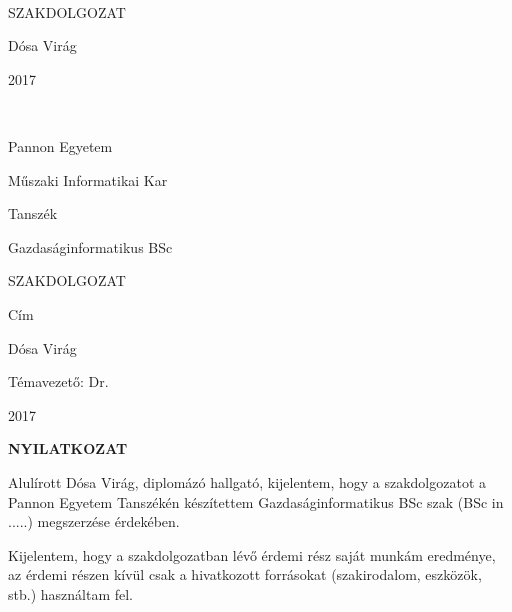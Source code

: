 \begin{titlepage}
	\setlength{\hoffset}{0mm}
	\pagestyle{empty}
	\begin{center} 
		~\\
		\vspace{125pt}	
		\Large SZAKDOLGOZAT
		\vspace{200pt}
		
		\Large Dósa Virág
		\vspace{60pt}
		
		\Large 2017
	\end{center}
	
	\newpage
	
	\pagestyle{empty}
	~\\
	
	\newpage
	\pagestyle{empty}
	\begin{center}
		\Large
		Pannon Egyetem
		
		\vspace{10mm}
		Műszaki Informatikai Kar
		
		\vspace{10mm}
		Tanszék
		
		\vspace{10mm}
		Gazdaságinformatikus BSc
		
		\vspace{40mm}
		\huge
		SZAKDOLGOZAT
		
		\vspace{10mm}
		\LARGE
		Cím
		
		\vspace{10mm}
		\Large
		Dósa Virág
		
		\vspace{15mm}
		Témavezető: Dr.
		
		\vspace{20mm}
		2017
		\normalsize
	\end{center}
\end{titlepage}

\setlength{\hoffset}{4mm}
\newpage
	
	
\newpage
	\pagestyle{plain}
	\Large
	\begin{center}
		\textbf{NYILATKOZAT}
	\end{center}
	\normalsize
	
	Alulírott Dósa Virág, diplomázó hallgató, kijelentem, hogy a szakdolgozatot a Pannon Egyetem Tanszékén készítettem Gazdaságinformatikus BSc szak (BSc in .....) megszerzése érdekében.
	
	Kijelentem, hogy a szakdolgozatban lévő érdemi rész saját munkám eredménye, az érdemi részen kívül csak a hivatkozott forrásokat (szakirodalom, eszközök, stb.) használtam fel.
	
